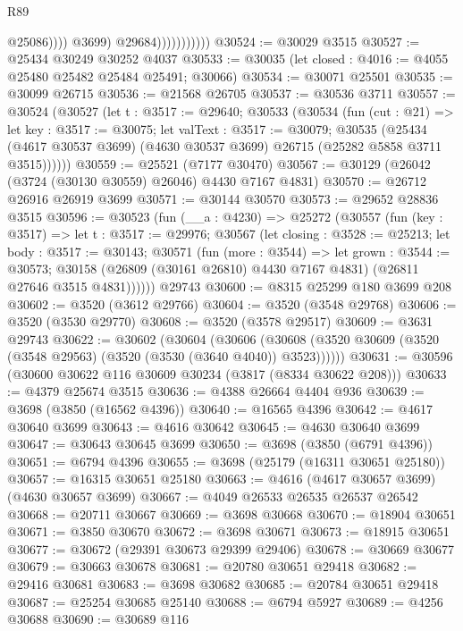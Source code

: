 \begin{lexlean}{R89}
\begin{coremodule}
                                    @25086))))
                            @3699)
                          @29684)))))))))))
@30524 := @30029 @3515
@30527 := @25434 @30249 @30252 @4037
@30533 := @30035 (let closed : @4016 := @4055 @25480 @25482 @25484 @25491; @30066)
@30534 := @30071 @25501
@30535 := @30099 @26715
@30536 := @21568 @26705
@30537 := @30536 @3711
@30557 := @30524
    (@30527
      (let t : @3517 := @29640;
      @30533
        (@30534
          (fun (cut : @21) =>
          let key : @3517 := @30075;
          let valText : @3517 := @30079;
          @30535
            (@25434 (@4617 @30537 @3699) (@4630 @30537 @3699) @26715 (@25282 @5858 @3711 @3515))))))
@30559 := @25521 (@7177 @30470)
@30567 := @30129 (@26042 (@3724 (@30130 @30559) @26046) @4430 @7167 @4831)
@30570 := @26712 @26916 @26919 @3699
@30571 := @30144 @30570
@30573 := @29652 @28836 @3515
@30596 := @30523
    (fun (__a : @4230) =>
    @25272
      (@30557
        (fun (key : @3517) =>
        let t : @3517 := @29976;
        @30567
          (let closing : @3528 := @25213;
          let body : @3517 := @30143;
          @30571
            (fun (more : @3544) =>
            let grown : @3544 := @30573;
            @30158 (@26809 (@30161 @26810) @4430 @7167 @4831) (@26811 @27646 @3515 @4831))))))
    @29743
@30600 := @8315 @25299 @180 @3699 @208
@30602 := @3520 (@3612 @29766)
@30604 := @3520 (@3548 @29768)
@30606 := @3520 (@3530 @29770)
@30608 := @3520 (@3578 @29517)
@30609 := @3631 @29743
@30622 := @30602
    (@30604
      (@30606 (@30608 (@3520 @30609 (@3520 (@3548 @29563) (@3520 (@3530 (@3640 @4040)) @3523))))))
@30631 := @30596 (@30600 @30622 @116 @30609 @30234 (@3817 (@8334 @30622 @208)))
@30633 := @4379 @25674 @3515
@30636 := @4388 @26664 @4404 @936
@30639 := @3698 (@3850 (@16562 @4396))
@30640 := @16565 @4396
@30642 := @4617 @30640 @3699
@30643 := @4616 @30642
@30645 := @4630 @30640 @3699
@30647 := @30643 @30645 @3699
@30650 := @3698 (@3850 (@6791 @4396))
@30651 := @6794 @4396
@30655 := @3698 (@25179 (@16311 @30651 @25180))
@30657 := @16315 @30651 @25180
@30663 := @4616 (@4617 @30657 @3699) (@4630 @30657 @3699)
@30667 := @4049 @26533 @26535 @26537 @26542
@30668 := @20711 @30667
@30669 := @3698 @30668
@30670 := @18904 @30651
@30671 := @3850 @30670
@30672 := @3698 @30671
@30673 := @18915 @30651
@30677 := @30672 (@29391 @30673 @29399 @29406)
@30678 := @30669 @30677
@30679 := @30663 @30678
@30681 := @20780 @30651 @29418
@30682 := @29416 @30681
@30683 := @3698 @30682
@30685 := @20784 @30651 @29418
@30687 := @25254 @30685 @25140
@30688 := @6794 @5927
@30689 := @4256 @30688
@30690 := @30689 @116

\end{coremodule}
\end{lexlean}
